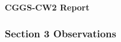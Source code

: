 \documentclass[11pt,a4paper]{article}
\begin{document}
 

{\Large \textbf{CGGS-CW2 Report}}\\
\indent {}

\subsubsection*{Section 3 Observations}
\end{document}

